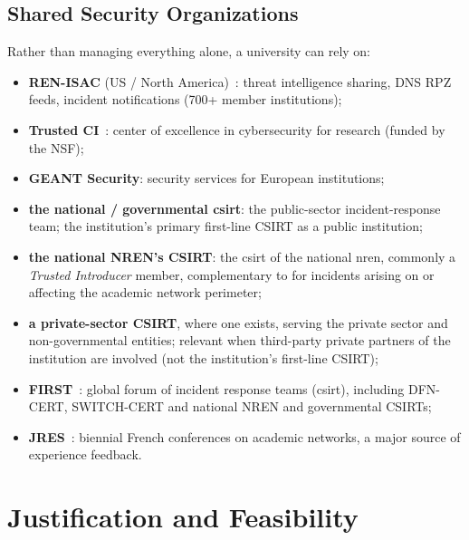 \subsection{Shared Security Organizations}

Rather than managing everything alone, a university can rely on:

\begin{itemize}[nosep]
    \item \textbf{REN-ISAC} (US / North America)~\cite{ren-isac}: threat intelligence
    sharing, DNS RPZ feeds, incident notifications (700+
    member institutions);
    \item \textbf{Trusted CI}~\cite{trustedci}: center of excellence
    in cybersecurity for research (funded by the NSF);
    \item \textbf{GEANT Security}: security services for
    European institutions;
    \item \textbf{the national / governmental \gls{csirt}}: the
    public-sector incident-response team; the institution's
    primary first-line CSIRT as a public institution;
    \item \textbf{the national NREN's CSIRT}: the \gls{csirt}
    of the national \gls{nren}, commonly a \emph{Trusted Introducer}
    member, complementary to  for incidents
    arising on or affecting the academic network perimeter;
    \item \textbf{a private-sector CSIRT}, where one exists, serving
    the private sector and non-governmental entities;
    relevant when third-party private partners of the
    institution are involved (not the institution's first-line
    CSIRT);
    \item \textbf{FIRST}~\cite{first}: global forum of incident
    response teams (\gls{csirt}), including DFN-CERT, SWITCH-CERT
    and national NREN and governmental CSIRTs;
    \item \textbf{JRES}~\cite{jres}: biennial French conferences on
    academic networks, a major source of experience feedback.
\end{itemize}

\section{Justification and Feasibility}
\label{sec:couts}

